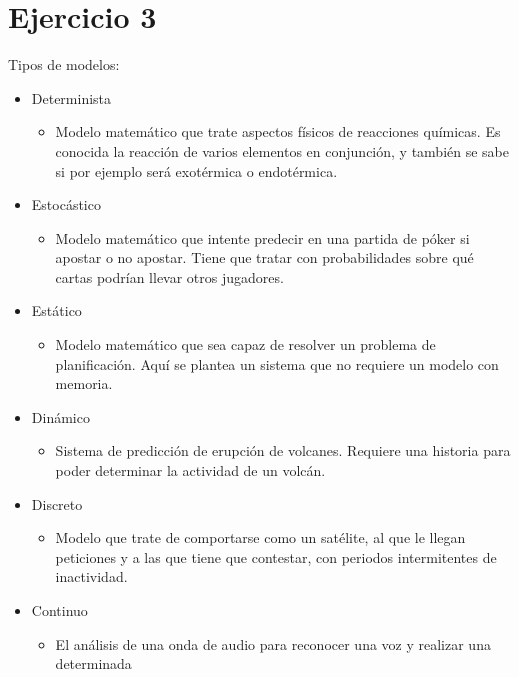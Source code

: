 \documentclass[12pt]{article}
\begin{document}
\section{Ejercicio 3}
Tipos de modelos:
\begin{itemize}
    \item Determinista
        \begin{itemize}
            \item Modelo matemático que trate aspectos físicos de reacciones químicas. Es conocida la
                  reacción de varios elementos en conjunción, y también se sabe si por ejemplo será
                  exotérmica o endotérmica.
        \end{itemize}
    \item Estocástico
        \begin{itemize}
            \item Modelo matemático que intente predecir en una partida de póker si apostar o no
                  apostar. Tiene que tratar con probabilidades sobre qué cartas podrían llevar otros
                  jugadores.
        \end{itemize}
    \item Estático
        \begin{itemize}
            \item Modelo matemático que sea capaz de resolver un problema de planificación. Aquí
                  se plantea un sistema que no requiere un modelo con memoria.
        \end{itemize}
    \item Dinámico
        \begin{itemize}
            \item Sistema de predicción de erupción de volcanes. Requiere una historia para poder
                  determinar la actividad de un volcán.
        \end{itemize}
    \item Discreto
        \begin{itemize}
            \item Modelo que trate de comportarse como un satélite, al que le llegan peticiones y
                  a las que tiene que contestar, con periodos intermitentes de inactividad.
        \end{itemize}
    \item Continuo
        \begin{itemize}
            \item El análisis de una onda de audio para reconocer una voz y realizar una determinada

\end{itemize}
\end{itemize}
\end{document}
